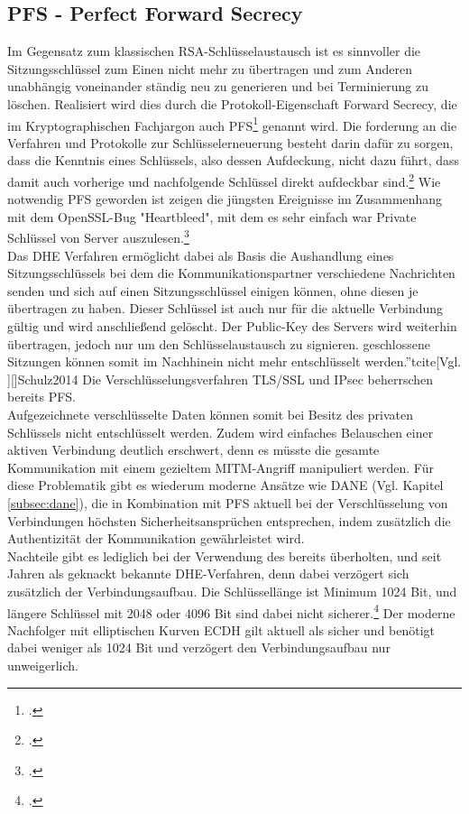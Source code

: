 \documentclass  [paper=a4,
				fontsize=12pt,
				listof=totoc,
				bibliography=totoc
				]{scrreprt}
\begin{document}
			\subsection{PFS - Perfect Forward Secrecy}
				Im Gegensatz zum klassischen RSA-Schlüsselaustausch ist es sinnvoller die Sitzungsschlüssel
				zum Einen nicht mehr zu übertragen und zum Anderen unabhängig voneinander ständig neu zu generieren und bei Terminierung zu löschen. Realisiert wird dies durch die Protokoll-Eigenschaft Forward Secrecy, die im Kryptographischen Fachjargon auch \ac{PFS}\footcite[Vgl.][]{Boeck2013} genannt wird. Die \glqq forderung an die Verfahren und Protokolle zur Schlüsselerneuerung besteht darin dafür zu sorgen, dass die Kenntnis eines Schlüssels, also dessen Aufdeckung, nicht dazu führt, dass damit auch vorherige und nachfolgende Schlüssel direkt aufdeckbar sind.\grqq\footcite[S. 439]{Eckert2013} Wie notwendig \ac{PFS} geworden ist zeigen die jüngsten Ereignisse im Zusammenhang mit dem OpenSSL-Bug "Heartbleed", mit dem es sehr einfach war Private Schlüssel von Server auszulesen.\footcite[Vgl. ][]{Zhu2014} \medskip\\
				Das \ac{DHE} Verfahren ermöglicht dabei als Basis die Aushandlung eines Sitzungsschlüssels bei dem die Kommunikationspartner verschiedene Nachrichten senden und sich auf einen Sitzungsschlüssel einigen können, ohne diesen je übertragen zu haben. Dieser Schlüssel ist auch nur für die aktuelle Verbindung gültig und wird anschließend gelöscht. Der Public-Key des Servers wird weiterhin übertragen, jedoch nur um den Schlüsselaustausch zu signieren. \glqq geschlossene Sitzungen können somit im Nachhinein nicht mehr entschlüsselt werden.\grqq''tcite[Vgl. ][]{Schulz2014} Die Verschlüsselungsverfahren \ac{TLS/SSL} und IPsec beherrschen bereits \ac{PFS}.\medskip\\
				Aufgezeichnete verschlüsselte Daten können somit bei Besitz des privaten Schlüssels nicht entschlüsselt werden. Zudem wird einfaches Belauschen einer aktiven Verbindung deutlich erschwert, denn es müsste die gesamte Kommunikation mit einem gezieltem \ac{MITM}-Angriff manipuliert werden. Für diese Problematik gibt es wiederum moderne Ansätze wie DANE (Vgl. Kapitel \ref{subsec:dane}), die in Kombination mit \ac{PFS} aktuell bei der Verschlüsselung von Verbindungen höchsten Sicherheitsansprüchen entsprechen, indem zusätzlich die Authentizität der Kommunikation gewährleistet wird.\medskip\\
				Nachteile gibt es lediglich bei der Verwendung des bereits überholten, und seit Jahren als geknackt bekannte \ac{DHE}-Verfahren, denn dabei verzögert sich zusätzlich der Verbindungsaufbau. Die Schlüssellänge ist Minimum 1024 Bit, und längere Schlüssel mit 2048 oder 4096 Bit sind dabei nicht sicherer.\footcite[Vgl.][]{Boeck2013} Der moderne Nachfolger mit elliptischen Kurven \ac{ECDH} gilt aktuell als sicher und benötigt dabei weniger als 1024 Bit und verzögert den Verbindungsaufbau nur unweigerlich.\medskip\\
\end{document}
